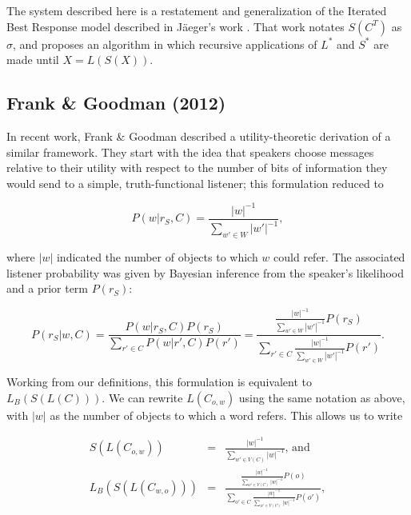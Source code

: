 \documentclass[man,noapacite]{apa2}
\begin{document}
The system described here is a restatement and generalization of the Iterated Best Response model described in J\"aeger's work \cite{jaegerinpress}. That work notates $S(C^T)$ as $\sigma$, and proposes an algorithm in which recursive applications of $L^*$ and $S^*$ are made until $X = L(S(X))$. 

\subsection{Frank \& Goodman (2012)}

In recent work, Frank \& Goodman \cite{frank2012} described a utility-theoretic derivation of a similar framework. They start with the idea that speakers choose messages relative to their utility with respect to the number of bits of information they would send to a simple, truth-functional listener; this formulation reduced to

\begin{equation}
P(w|r_S,C) = \frac{|w|^{-1}}{\displaystyle \sum_{w' \in W} {|w'|^{-1}}},
\end{equation}

where $|w|$ indicated the number of objects to which $w$ could refer. The associated listener probability was given by Bayesian inference from the speaker's likelihood and a prior term $P(r_S)$:

\begin{equation}
\label{eq:fg}
P(r_S | w, C) 
= \frac{P(w | r_S, C) P(r_S)}{\displaystyle \sum_{r' \in C}{P(w | r', C) P(r')}} =
\frac{\frac{\displaystyle |w|^{-1}}{\displaystyle \sum_{w' \in W} {|w'|^{-1}}}P(r_S)}{\displaystyle \sum_{r' \in C}{\frac{|w|^{-1}}{\displaystyle \sum_{w' \in W} {|w'|^{-1}}}P(r')}}.
\end{equation}

Working from our definitions, this formulation is equivalent to $L_B(S(L(C)))$. We can rewrite $L(C_{o,w})$ using the same notation as above, with $|w|$ as the number of objects to which a word refers. This allows us to write 

\begin{eqnarray*}
S(L(C_{o,w})) &=& \frac{|w|^{-1}}{\displaystyle \sum_{w' \in V(C)} |w|^{-1}} \mbox{, and} \\
L_B(S(L(C_{w,o}))) &=& \frac{ \frac{\displaystyle |w|^{-1}}{\displaystyle \sum_{w' \in V(C)} |w|^{-1}}P(o)}{\displaystyle\sum_{o' \in C}  \frac{|w|^{-1}}{\displaystyle \sum_{w' \in V(C)} |w|^{-1}}P(o')},
\end{eqnarray*}
\end{document}
